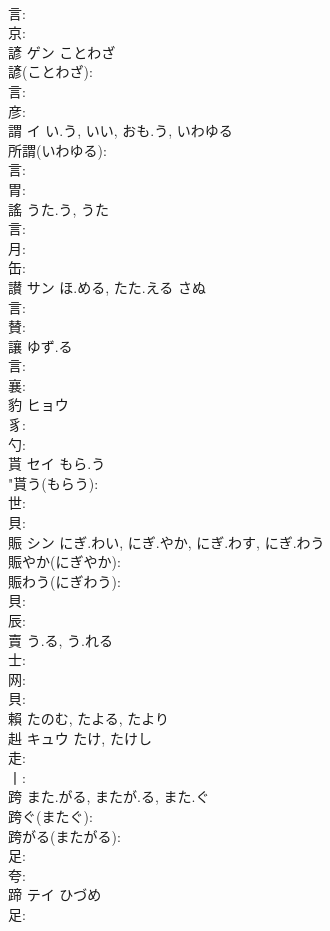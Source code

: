 \documentclass[8pt]{extreport}
\begin{document}
\begin{CJK}{UTF8}{min}
\\	言: 
\\	京: 
\\	諺	ゲン	ことわざ		
\\	諺(ことわざ): 
\\	言: 
\\	彦: 
\\	謂	イ	い.う, いい, おも.う, いわゆる		
\\	所謂(いわゆる): 
\\	言: 
\\	胃: 
\\	謠		うた.う, うた				
\\	言: 
\\	月: 
\\	缶: 
\\	讃	サン	ほ.める, たた.える	さぬ	
\\	言: 
\\	賛: 
\\	讓		ゆず.る				
\\	言: 
\\	襄: 
\\	豹	ヒョウ			
\\	豸: 
\\	勺: 
\\	貰	セイ	もら.う		
\\	"貰う(もらう): 
\\	世: 
\\	貝: 
\\	賑	シン	にぎ.わい, にぎ.やか, にぎ.わす, にぎ.わう		
\\	賑やか(にぎやか): 
\\	賑わう(にぎわう): 
\\	貝: 
\\	辰: 
\\	賣		う.る, う.れる				
\\	士: 
\\	网: 
\\	貝: 
\\	賴		たのむ, たよる, たより				
\\	赳	キュウ		たけ, たけし	
\\	走: 
\\	丨: 
\\	跨		また.がる, またが.る, また.ぐ			
\\	跨ぐ(またぐ): 
\\	跨がる(またがる): 
\\	足: 
\\	夸: 
\\	蹄	テイ	ひづめ		
\\	足: 

\end{CJK}
\end{document}

